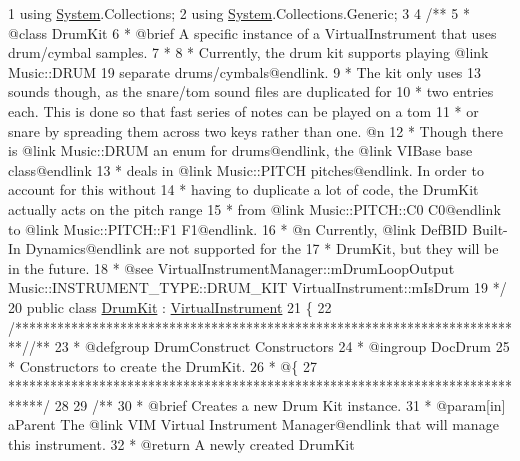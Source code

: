 \begin{DoxyCodeInclude}
1 \textcolor{keyword}{using} \hyperlink{namespace_system}{System}.Collections;
2 \textcolor{keyword}{using} \hyperlink{namespace_system}{System}.Collections.Generic;
3 \textcolor{comment}{}
4 \textcolor{comment}{/**}
5 \textcolor{comment}{ * @class DrumKit}
6 \textcolor{comment}{ * @brief A specific instance of a VirtualInstrument that uses drum/cymbal samples. }
7 \textcolor{comment}{ * }
8 \textcolor{comment}{ * Currently, the drum kit supports playing @link Music::DRUM 19 separate drums/cymbals@endlink.}
9 \textcolor{comment}{ * The kit only uses 13 sounds though, as the snare/tom sound files are duplicated for }
10 \textcolor{comment}{ * two entries each. This is done so that fast series of notes can be played on a tom}
11 \textcolor{comment}{ * or snare by spreading them across two keys rather than one. @n}
12 \textcolor{comment}{ * Though there is @link Music::DRUM an enum for drums@endlink, the @link VIBase base class@endlink}
13 \textcolor{comment}{ * deals in @link Music::PITCH pitches@endlink. In order to account for this without}
14 \textcolor{comment}{ * having to duplicate a lot of code, the DrumKit actually acts on the pitch range}
15 \textcolor{comment}{ * from @link Music::PITCH::C0 C0@endlink to @link Music::PITCH::F1 F1@endlink. }
16 \textcolor{comment}{ * @n Currently, @link DefBID Built-In Dynamics@endlink are not supported for the }
17 \textcolor{comment}{ * DrumKit, but they will be in the future.}
18 \textcolor{comment}{ * @see VirtualInstrumentManager::mDrumLoopOutput Music::INSTRUMENT\_TYPE::DRUM\_KIT
       VirtualInstrument::mIsDrum}
19 \textcolor{comment}{*/}
20 \textcolor{keyword}{public} \textcolor{keyword}{class }\hyperlink{class_drum_kit}{DrumKit} : \hyperlink{class_virtual_instrument}{VirtualInstrument}
21 \{
22     \textcolor{comment}{/*************************************************************************/}\textcolor{comment}{/** }
23 \textcolor{comment}{     * @defgroup DrumConstruct Constructors}
24 \textcolor{comment}{     * @ingroup DocDrum}
25 \textcolor{comment}{     * Constructors to create the DrumKit.}
26 \textcolor{comment}{     * @\{}
27 \textcolor{comment}{    *****************************************************************************/}
28 \textcolor{comment}{}
29 \textcolor{comment}{    /**}
30 \textcolor{comment}{     * @brief Creates a new Drum Kit instance.}
31 \textcolor{comment}{     * @param[in] aParent The @link VIM Virtual Instrument Manager@endlink that will manage this
       instrument.}
32 \textcolor{comment}{     * @return A newly created DrumKit}

\end{DoxyCodeInclude}
